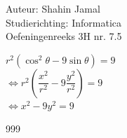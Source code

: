 \documentclass[a4paper]{article}
\begin{document}
  
\noindent \large Auteur: Shahin Jamal \\
\noindent \large Studierichting: Informatica\\
\noindent \large Oefeningenreeks 3H nr. 7.5\\

\medskip

\normalsize

$r^2(\cos^2\theta - 9\sin\theta) = 9$\\

$\Leftrightarrow r^2\left(\dfrac{x^2}{r^2} - 9\dfrac{y^2}{r^2}\right) = 9$\\

$\Leftrightarrow x^2 - 9y^2 = 9$\\

\begin{thebibliography}{999}
\end{thebibliography}
\end{document}
